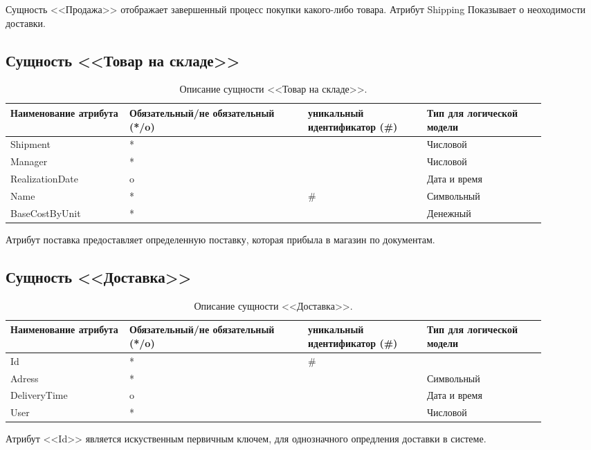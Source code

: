 \documentclass[14pt]{extreport}
\begin{document}
        Сущность <<Продажа>> отображает завершенный процесс покупки какого-либо товара. Атрибут Shipping Показывает о неоходимости доставки.
    
    \subsection*{Сущность <<Товар на складе>>}

        \begin{table}[H]
            \begin{tabular}{|p{0.2\linewidth}|p{0.3\linewidth}|p{0.2\linewidth}|p{0.2\linewidth}|}
                \hline
                Наименование атрибута & Обязательный/не обязательный (*/o) & уникальный идентификатор (\#) & Тип для логической модели
                \\ \hline
                Shipment & * & & Числовой\\ \hline
                Manager & * & & Числовой\\ \hline
                RealizationDate & o & & Дата и время \\ \hline
                Name & * & \# & Символьный  \\ \hline
                BaseCostByUnit & * & & Денежный \\ \hline  
            \end{tabular}
            \caption{Описание сущности <<Товар на складе>>.}
        \end{table}

        Атрибут поставка предоставляет определенную поставку, которая прибыла в магазин по документам.
    
    \subsection*{Сущность <<Доставка>>}

        \begin{table}[H]
            \begin{tabular}{|p{0.2\linewidth}|p{0.3\linewidth}|p{0.2\linewidth}|p{0.2\linewidth}|}
                \hline
                Наименование атрибута & Обязательный/не обязательный (*/o) & уникальный идентификатор (\#) & Тип для логической модели
                \\ \hline
                Id & * & \# & \\ \hline
                Adress & * & & Символьный\\ \hline
                DeliveryTime & o & & Дата и время \\ \hline
                User & * &  & Числовой  \\ \hline
            \end{tabular}
            \caption{Описание сущности <<Доставка>>.}
        \end{table}

        Атрибут <<Id>> является искуственным первичным ключем, для однозначного опредления доставки в системе.
        
    
 
\end{document}
